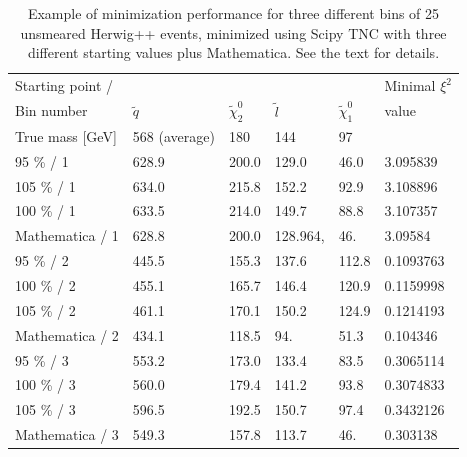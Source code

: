 \documentclass[twoside,english]{uiofysmaster}
\begin{document}
\begin{table}[hbt]
	\centering
	\begin{tabular}{| l | l | l | l | l | l |}
		\hline
		Starting point / &&&&																					&  Minimal $\xi^2$ \\ 
		Bin number 						& $\tilde q$	& $\tilde \chi_2^0$	& $\tilde l$	& $\tilde \chi_1^0$ & value \\ \hline
		True mass [GeV]					& 568 (average) & 180 				& 144 			& 97 				& \\ \hline
		95 \%  / 1 						& 628.9   		& 200.0   			& 129.0   		& 46.0     			& 3.095839 \\ \hline
		105 \% / 1 						& 634.0   		& 215.8   			& 152.2   		& 92.9     			& 3.108896 \\ \hline
		100 \% / 1 						& 633.5   		& 214.0   			& 149.7   		& 88.8     			& 3.107357 \\ \hline
		Mathematica / 1 			    & 628.8 		& 200.0				& 128.964,		& 46.				& 3.09584		\\ \hline
		95 \%  / 2 						& 445.5   		& 155.3   			& 137.6   		& 112.8    			& 0.1093763 \\ \hline
		100 \% / 2 						& 455.1   		& 165.7   			& 146.4   		& 120.9    			& 0.1159998 \\ \hline
		105 \% / 2 						& 461.1   		& 170.1   			& 150.2   		& 124.9    			& 0.1214193 \\ \hline
		Mathematica / 2 				& 434.1 		& 118.5 			& 94. 			& 51.3 				& 0.104346	\\ \hline
		95 \%  / 3 						& 553.2   		& 173.0   			& 133.4   		& 83.5     			& 0.3065114 \\ \hline
		100 \% / 3 						& 560.0   		& 179.4   			& 141.2   		& 93.8     			& 0.3074833 \\ \hline
		105 \% / 3 				 		& 596.5   		& 192.5   			& 150.7   		& 97.4     			& 0.3432126 \\ \hline
		Mathematica / 3 				& 549.3 		& 157.8 			& 113.7 		& 46. 				& 0.303138 \\ \hline	
	\end{tabular}
	\caption{Example of minimization performance for three different bins of 25 unsmeared {\ttfamily Herwig++} events, minimized using Scipy TNC with three different starting values plus Mathematica. See the text for details.}
	\label{table:starting_point_fit_dependency}
\end{table}
\end{document}
